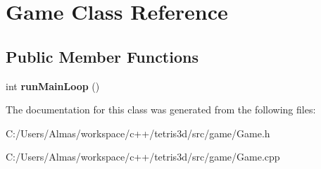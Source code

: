 \hypertarget{class_game}{\section{Game Class Reference}
\label{class_game}
}
\subsection*{Public Member Functions}
\begin{DoxyCompactItemize}
\item 
\hypertarget{class_game_a5a72e867d761ef72d01a4c1161efcc6f}{int {\bfseries run\-Main\-Loop} ()}\label{class_game_a5a72e867d761ef72d01a4c1161efcc6f}

\end{DoxyCompactItemize}


The documentation for this class was generated from the following files\-:\begin{DoxyCompactItemize}
\item 
C\-:/\-Users/\-Almas/workspace/c++/tetris3d/src/game/Game.\-h\item 
C\-:/\-Users/\-Almas/workspace/c++/tetris3d/src/game/Game.\-cpp\end{DoxyCompactItemize}
